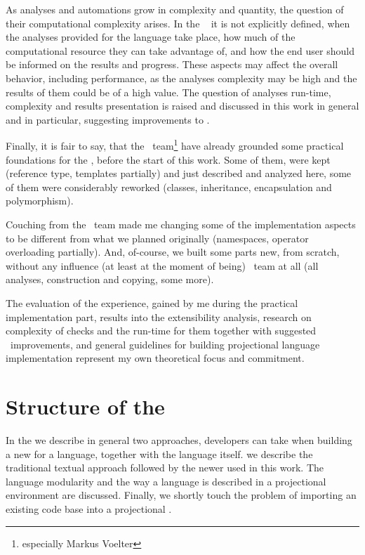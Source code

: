 As analyses and automations grow in complexity and quantity, the question of their computational complexity arises.
In the \jbmps\  it is not explicitly defined, when the analyses provided for the language take place, 
how much of the computational resource they can take advantage of, and how the end user should be informed on the results and progress. 
These aspects may affect the overall  behavior, including performance, as the analyses complexity may be high and the results of them could 
be of a high value. 
The question of analyses run-time, complexity and results presentation is raised and discussed in 
this work in general and in particular, suggesting improvements to \jbmps {}.



Finally, it is fair to say, that the \mbdr\ team\footnote{especially Markus Voelter} have already grounded some practical foundations for the \pcpp, 
before the start of this work. Some of them, were kept (reference type, templates partially) and just described and analyzed 
here, some of them were considerably reworked (classes, inheritance, encapsulation and polymorphism). 

Couching from the \mbdr\ team made me changing some of the implementation aspects to be different from what we planned originally (namespaces,
operator overloading partially). And, of-course, we built some parts new, from scratch, without any influence (at least at the moment of being) \mbdr\ team 
at all (all analyses, construction and copying, some more). 

The evaluation of the experience, gained by me during the practical implementation part, results into the extensibility analysis, 
research on complexity of checks and the run-time for them together with suggested \jbmps\ improvements, and general guidelines 
for building projectional language implementation represent my own theoretical focus and commitment.

\section{Structure of the \MT}

In the  we describe in general two approaches,  developers can take when
building a new  for a language, together with the language itself. we describe the traditional 
textual approach followed by the newer  used in this work. The language 
modularity and the way a language is described in a projectional environment are discussed. Finally,
we shortly touch the problem of importing an existing code base into a projectional .

